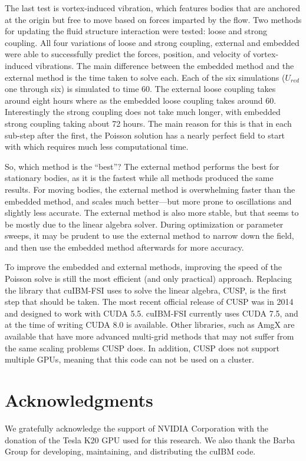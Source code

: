 \documentclass[preprint,12pt]{elsarticle}
\begin{document}
The last test is vortex-induced vibration, which features bodies that are anchored at the origin but free to move based on forces imparted by the flow.
Two methods for updating the fluid structure interaction were tested: loose and strong coupling.
All four variations of loose and strong coupling, external and embedded were able to successfully predict the forces, position, and velocity of vortex-induced vibrations.
The main difference between the embedded method and the external method is the time taken to solve each.
Each of the six simulations ($U_{red}$ one through six) is simulated to time 60.
The external loose coupling takes around eight hours where as the embedded loose coupling takes around 60.
Interestingly the strong coupling does not take much longer, with embedded strong coupling taking about 72 hours.
The main reason for this is that in each sub-step after the first, the Poisson solution has a nearly perfect field to start with which requires much less computational time.

So, which method is the ``best''?
The external method performs the best for stationary bodies, as it is the fastest while all methods produced the same results.
For moving bodies, the external method is overwhelming faster than the embedded method, and scales much better---but more prone to oscillations and slightly less accurate.
The external method is also more stable, but that seems to be mostly due to the linear algebra solver.
During optimization or parameter sweeps, it may be prudent to use the external method to narrow down the field, and then use the embedded method afterwards for more accuracy.

To improve the embedded and external methods, improving the speed of the Poisson solve is still the most efficient (and only practical) approach.
Replacing the library that cuIBM-FSI uses to solve the linear algebra, CUSP, is the first step that should be taken.
The most recent official release of CUSP was in 2014 and designed to work with CUDA 5.5.
cuIBM-FSI currently uses CUDA 7.5, and at the time of writing CUDA 8.0 is available.
Other libraries, such as AmgX are available that have more advanced multi-grid methods that may not suffer from the same scaling problems CUSP does.
In addition, CUSP does not support multiple GPUs, meaning that this code can not be used on a cluster.

\section*{Acknowledgments}
We gratefully acknowledge the support of NVIDIA Corporation with the donation of the Tesla K20 GPU used for this research.
We also thank the Barba Group for developing, maintaining, and distributing the cuIBM code.
\end{document}
